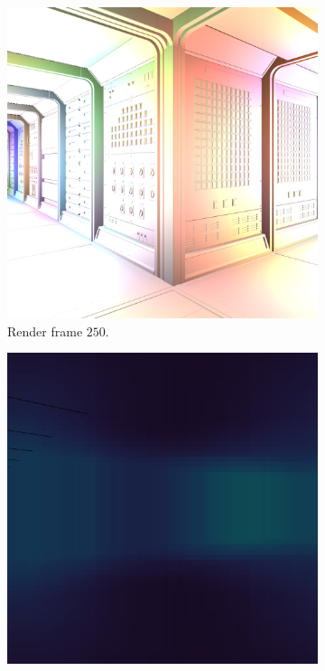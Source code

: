 \begin{figure}[t]
  \centering
  \begin{subfigure}[b]{0.35\textwidth}
    \includegraphics[width=\textwidth]{./img/raw/lc-frame-example/render/si_frame_250.png}
    \caption{Render frame $250$.}
    \vspace{2pt}
    \label{fig:ts-test-frames-example:zc:250render}
  \end{subfigure}\quad %
  \begin{subfigure}[b]{0.35\textwidth}
    \includegraphics[width=\textwidth]{./img/raw/lc-frame-example/ts/si_frame_250.png}

\end{subfigure}
\end{figure}
